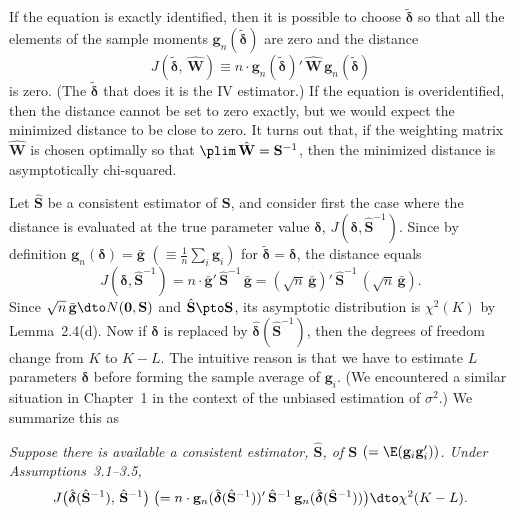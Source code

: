 
If the equation is exactly identified, then it is possible to choose $\tilde{\boldsymbol{\delta}}$
so that all the elements of the sample moments $\mathbf{g}_n(\tilde{\boldsymbol{\delta}})$ are zero and
the distance
\[
  J(\tilde{\boldsymbol{\delta}},\, \hat{\mathbf{W}})
  \equiv n \cdot \mathbf{g}_n(\tilde{\boldsymbol{\delta}})'\,
  \hat{\mathbf{W}}\, \mathbf{g}_n(\tilde{\boldsymbol{\delta}})
\]
is zero.  (The $\tilde{\boldsymbol{\delta}}$ that does it is the IV estimator.)  If the equation is
overidentified, then the distance cannot be set to zero exactly, but we would expect the
minimized distance to be close to zero.  It turns out that, if the weighting matrix
$\hat{\mathbf{W}}$ is chosen optimally so that $\plim\, \hat{\mathbf{W}} = \mathbf{S}^{-1}$, then
the minimized distance is asymptotically chi-squared.

Let $\hat{\mathbf{S}}$ be a consistent estimator of $\mathbf{S}$, and consider first the case where the
distance is evaluated at the true parameter value $\boldsymbol{\delta}$,
$J(\boldsymbol{\delta}, \hat{\mathbf{S}}^{-1})$.  Since by definition
$\mathbf{g}_n(\boldsymbol{\delta}) = \bar{\mathbf{g}}$
$(\equiv \frac{1}{n} \sum_i \mathbf{g}_i)$ for
$\tilde{\boldsymbol{\delta}} = \boldsymbol{\delta}$, the distance equals
\begin{equation}
  J(\boldsymbol{\delta}, \hat{\mathbf{S}}^{-1})
  = n \cdot \bar{\mathbf{g}}'\, \hat{\mathbf{S}}^{-1}\, \bar{\mathbf{g}}
  = (\sqrt{n}\, \bar{\mathbf{g}})'\, \hat{\mathbf{S}}^{-1}\,
    (\sqrt{n}\, \bar{\mathbf{g}}).
  \label{eq:3.6.1}
\end{equation}
Since $\sqrt{n}\, \bar{\mathbf{g}} \dto N(\mathbf{0}, \mathbf{S})$ and
$\hat{\mathbf{S}} \pto \mathbf{S}$, its asymptotic distribution is $\chi^2(K)$ by
Lemma~2.4(d).  Now if $\boldsymbol{\delta}$ is replaced by
$\hat{\boldsymbol{\delta}}(\hat{\mathbf{S}}^{-1})$, then the degrees of freedom change
from $K$ to $K - L$.  The intuitive reason is that we have to estimate $L$ parameters
$\boldsymbol{\delta}$ before forming the sample average of $\mathbf{g}_i$.  (We encountered a similar
situation in Chapter~1 in the context of the unbiased estimation of $\sigma^2$.)  We summarize
this as

\begin{proposition}
\label{prop:3.6}
\emph{Suppose there is available a consistent estimator, $\hat{\mathbf{S}}$, of
$\mathbf{S}$ $(= \E(\mathbf{g}_i \mathbf{g}_i'))$.  Under Assumptions~3.1--3.5,}
\[
  J\bigl(\hat{\boldsymbol{\delta}}(\hat{\mathbf{S}}^{-1}),\,
  \hat{\mathbf{S}}^{-1}\bigr)
  \;\bigl(= n \cdot
  \mathbf{g}_n(\hat{\boldsymbol{\delta}}(\hat{\mathbf{S}}^{-1}))'\,
  \hat{\mathbf{S}}^{-1}\,
  \mathbf{g}_n(\hat{\boldsymbol{\delta}}(\hat{\mathbf{S}}^{-1}))\bigr)
  \dto \chi^2(K - L).
\]
\end{proposition}


